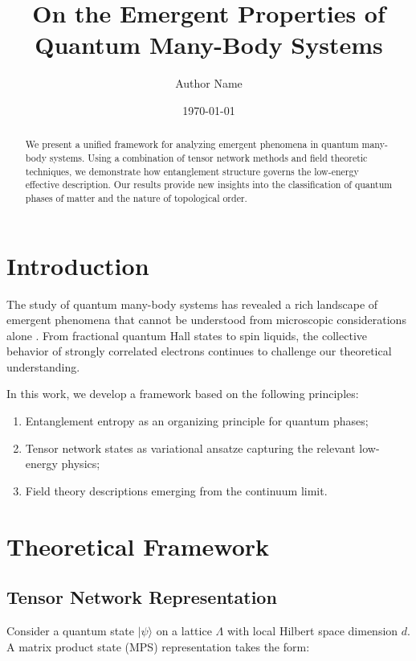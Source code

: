 \documentclass[paper]{academic-report}
\title{On the Emergent Properties of\\Quantum Many-Body Systems}
\author{Author Name}
\date{\today}
\begin{document}
\maketitle

\begin{abstract}
We present a unified framework for analyzing emergent phenomena in quantum
many-body systems. Using a combination of tensor network methods and field
theoretic techniques, we demonstrate how entanglement structure governs the
low-energy effective description. Our results provide new insights into the
classification of quantum phases of matter and the nature of topological order.
\end{abstract}

\section{Introduction}

The study of quantum many-body systems has revealed a rich landscape of emergent
phenomena that cannot be understood from microscopic considerations alone
\cite{witten2018}. From fractional quantum Hall states to spin liquids, the
collective behavior of strongly correlated electrons continues to challenge our
theoretical understanding.

In this work, we develop a framework based on the following principles:
\begin{enumerate}
  \item Entanglement entropy as an organizing principle for quantum phases;
  \item Tensor network states as variational ansatze capturing the relevant
        low-energy physics;
  \item Field theory descriptions emerging from the continuum limit.
\end{enumerate}

\section{Theoretical Framework}

\subsection{Tensor Network Representation}

Consider a quantum state $|\psi\rangle$ on a lattice $\Lambda$ with local
Hilbert space dimension $d$. A matrix product state (MPS) representation takes
the form:
\end{document}
